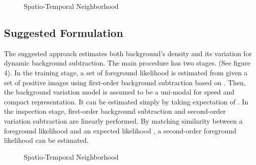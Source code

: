 \documentclass[conference]{IEEEtran}
\begin{document}
\begin{figure}[!t]
  \centering
  \label{fig:40}
  \hfill
  \caption{Spatio-Temporal Neighborhood}
\end{figure}


\subsection{Suggested Formulation}
The suggested approach estimates both background’s density and its variation for dynamic background subtraction. The main procedure has two stages. (See figure 4). In the training stage, a set of foreground likelihood   is estimated from given a set of positive images   using first-order background subtraction based on  . Then, the background variation model is assumed to be a uni-modal for speed and compact representation. It can be estimated simply by taking expectation of  . In the inspection stage, first-order background subtraction and second-order variation subtraction are linearly performed. By matching similarity between a foreground likelihood   and an expected likelihood  , a second-order foreground likelihood   can be estimated.

\begin{figure}[!t]
  \centering
  \label{fig:50}
  \caption{Spatio-Temporal Neighborhood}
\end{figure}
\end{document}

